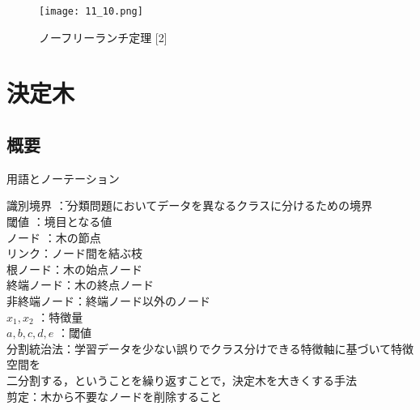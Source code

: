 \documentclass[dvipdfmx]{jreport}
\begin{document}
\begin{figure}[h]
    \begin{center}
        \texttt{[image: 11\_10.png]}
        \caption{ノーフリーランチ定理 [2]} \label{fig:10}
    \end{center}
\end{figure}

\section{決定木}
\subsection{概要}
\begin{itembox}[l]{\large{用語とノーテーション}}
    \begin{tabbing}
        \hspace{15pt} \raisebox{0.5ex}{\tiny $\bullet$} 識別境界 \hspace{20pt}\=：分類問題においてデータを異なるクラスに分けるための境界\\[0.5em]
        \hspace{15pt} \raisebox{0.5ex}{\tiny $\bullet$} 閾値 \>：境目となる値\\[0.5em]
        \hspace{15pt} \raisebox{0.5ex}{\tiny $\bullet$} ノード \>：木の節点\\[0.5em]
        \hspace{15pt} \raisebox{0.5ex}{\tiny $\bullet$} リンク\>：ノード間を結ぶ枝\\[0.5em]
        \hspace{15pt} \raisebox{0.5ex}{\tiny $\bullet$} 根ノード\>：木の始点ノード\\[0.5em]
        \hspace{15pt} \raisebox{0.5ex}{\tiny $\bullet$} 終端ノード\>：木の終点ノード\\[0.5em]
        \hspace{15pt} \raisebox{0.5ex}{\tiny $\bullet$} 非終端ノード\>：終端ノード以外のノード\\[0.5em]

        \hspace{15pt} \raisebox{0.5ex}{\tiny $\bullet$} $x_1,x_2$ \>：特徴量\\[0.5em]
        \hspace{15pt} \raisebox{0.5ex}{\tiny $\bullet$} $a, b, c, d, e$ \>：閾値\\[0.5em]
        \hspace{15pt} \raisebox{0.5ex}{\tiny $\bullet$} 分割統治法\>：学習データを少ない誤りでクラス分けできる特徴軸に基づいて特徴空間を\\[0.5em]
        \>\hspace{6.5pt}二分割する，ということを繰り返すことで，決定木を大きくする手法\\[0.5em]
        \hspace{15pt} \raisebox{0.5ex}{\tiny $\bullet$} 剪定\>：木から不要なノードを削除すること
    \end{tabbing}
\end{itembox}
\end{document}
